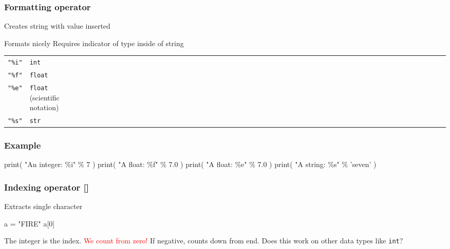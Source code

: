 \documentclass[11pt]{beamer}
\begin{document}
\begin{frame}
  \frametitle{Formatting operator}
  \Enlarge

  \begin{itemize}
  \myitem  Creates string with value inserted
    \begin{itemize}
    \mysubitem  Formats nicely
    \mysubitem  Requires indicator of type inside of string
      \begin{tabular}{*{27}{ll}}
        \texttt{"\%i"} & \texttt{int} \\
        \texttt{"\%f"} & \texttt{float} \\
        \texttt{"\%e"} & \texttt{float} (scientific notation) \\
        \texttt{"\%s"} & \texttt{str}
      \end{tabular}
    \end{itemize}
  \end{itemize}
\end{frame}

\begin{frame}[fragile]
  \frametitle{Example}
  \Enlarge

  \begin{semiverbatim}
print( "An integer:  \%i" \% 7 )
print( "A float:     \%f" \% 7.0 )
print( "A float:     \%e" \% 7.0 )
print( "A string:    \%s" \% 'seven' )
  \end{semiverbatim}
\end{frame}

\begin{frame}[fragile]
  \frametitle{Indexing operator \textbf{[]}}
  \Enlarge

  \begin{itemize}
  \myitem  Extracts single character
\begin{semiverbatim}
a = "FIRE"
a[0]
\end{semiverbatim}
  \myitem  The integer is the index. \pause
  \myitem  \textcolor{red}{We count from zero!} \pause
  \myitem  If negative, counts down from end. \pause
  \myitem  Does this work on other data types like \texttt{int}?
  \end{itemize}
\end{frame}
\end{document}

